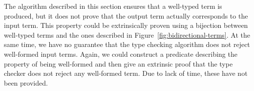 The algorithm described in this section ensures that a well-typed term is produced, but it does not prove that the output term actually corresponds to the input term. This property could be extrinsically proven using a bijection between well-typed terms and the ones described in Figure~\ref{fig:bidirectional-terms}. At the same time, we have no guarantee that the type checking algorithm does not reject well-formed input terms. Again, we could construct a predicate describing the property of being well-formed and then give an extrinsic proof that the type checker does not reject any well-formed term. Due to lack of time, these have not been provided.

